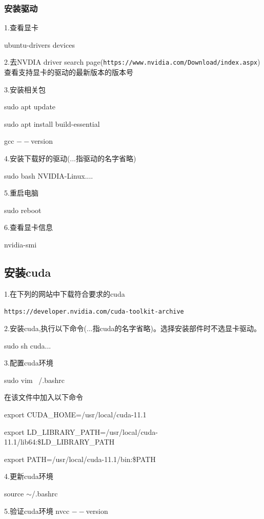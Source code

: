 \documentclass[openbib]{article}
\begin{document}
\subsubsection{安装驱动}  
1.查看显卡

ubuntu-drivers devices

2.去NVDIA driver search page(\texttt{https://www.nvidia.com/Download/index.aspx})查看支持显卡的驱动的最新版本的版本号

3.安装相关包

sudo apt update

sudo apt install build-essential

gcc $--$version

4.安装下载好的驱动(...指驱动的名字省略)

sudo bash NVIDIA-Linux....

5.重启电脑

sudo reboot

6.查看显卡信息

nvidia-smi

\subsection{安装cuda}
1.在下列的网站中下载符合要求的cuda

\texttt{https://developer.nvidia.com/cuda-toolkit-archive}

2.安装cuda,执行以下命令(...指cuda的名字省略)。选择安装部件时不选显卡驱动。

sudo sh cuda... 

3.配置cuda环境

sudo vim ~/.bashrc

在该文件中加入以下命令

export CUDA\_HOME=/usr/local/cuda-11.1

export LD\_LIBRARY\_PATH=/usr/local/cuda-11.1/lib64:\$LD\_LIBRARY\_PATH

export PATH=/usr/local/cuda-11.1/bin:\$PATH

4.更新cuda环境

source $\sim$/.bashrc

5.验证cuda环境
nvcc $--$version
\end{document}
